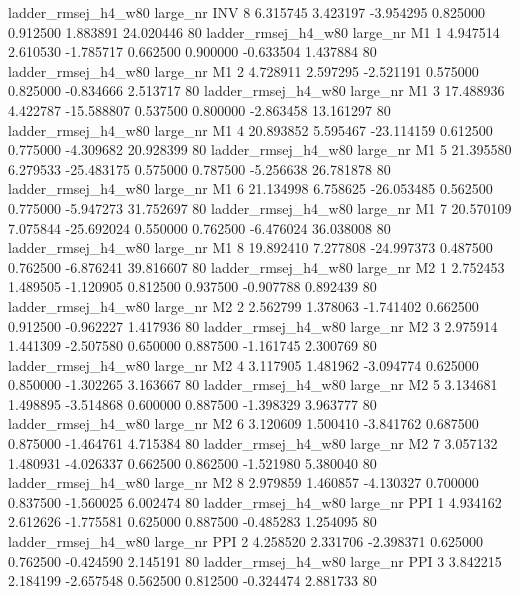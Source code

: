 ladder_rmsej_h4_w80   large_nr      INV                 8  6.315745  3.423197  -3.954295 0.825000 0.912500  1.883891   24.020446 80
ladder_rmsej_h4_w80   large_nr       M1                 1  4.947514  2.610530  -1.785717 0.662500 0.900000 -0.633504    1.437884 80
ladder_rmsej_h4_w80   large_nr       M1                 2  4.728911  2.597295  -2.521191 0.575000 0.825000 -0.834666    2.513717 80
ladder_rmsej_h4_w80   large_nr       M1                 3 17.488936  4.422787 -15.588807 0.537500 0.800000 -2.863458   13.161297 80
ladder_rmsej_h4_w80   large_nr       M1                 4 20.893852  5.595467 -23.114159 0.612500 0.775000 -4.309682   20.928399 80
ladder_rmsej_h4_w80   large_nr       M1                 5 21.395580  6.279533 -25.483175 0.575000 0.787500 -5.256638   26.781878 80
ladder_rmsej_h4_w80   large_nr       M1                 6 21.134998  6.758625 -26.053485 0.562500 0.775000 -5.947273   31.752697 80
ladder_rmsej_h4_w80   large_nr       M1                 7 20.570109  7.075844 -25.692024 0.550000 0.762500 -6.476024   36.038008 80
ladder_rmsej_h4_w80   large_nr       M1                 8 19.892410  7.277808 -24.997373 0.487500 0.762500 -6.876241   39.816607 80
ladder_rmsej_h4_w80   large_nr       M2                 1  2.752453  1.489505  -1.120905 0.812500 0.937500 -0.907788    0.892439 80
ladder_rmsej_h4_w80   large_nr       M2                 2  2.562799  1.378063  -1.741402 0.662500 0.912500 -0.962227    1.417936 80
ladder_rmsej_h4_w80   large_nr       M2                 3  2.975914  1.441309  -2.507580 0.650000 0.887500 -1.161745    2.300769 80
ladder_rmsej_h4_w80   large_nr       M2                 4  3.117905  1.481962  -3.094774 0.625000 0.850000 -1.302265    3.163667 80
ladder_rmsej_h4_w80   large_nr       M2                 5  3.134681  1.498895  -3.514868 0.600000 0.887500 -1.398329    3.963777 80
ladder_rmsej_h4_w80   large_nr       M2                 6  3.120609  1.500410  -3.841762 0.687500 0.875000 -1.464761    4.715384 80
ladder_rmsej_h4_w80   large_nr       M2                 7  3.057132  1.480931  -4.026337 0.662500 0.862500 -1.521980    5.380040 80
ladder_rmsej_h4_w80   large_nr       M2                 8  2.979859  1.460857  -4.130327 0.700000 0.837500 -1.560025    6.002474 80
ladder_rmsej_h4_w80   large_nr      PPI                 1  4.934162  2.612626  -1.775581 0.625000 0.887500 -0.485283    1.254095 80
ladder_rmsej_h4_w80   large_nr      PPI                 2  4.258520  2.331706  -2.398371 0.625000 0.762500 -0.424590    2.145191 80
ladder_rmsej_h4_w80   large_nr      PPI                 3  3.842215  2.184199  -2.657548 0.562500 0.812500 -0.324474    2.881733 80
